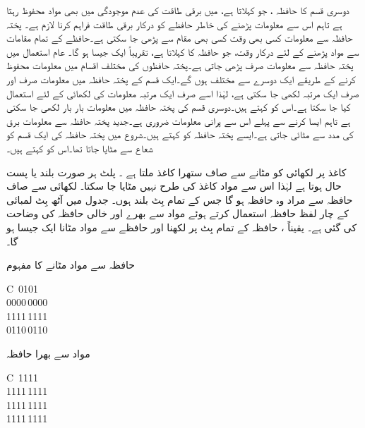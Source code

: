 دوسری قسم کا حافظہ ، جو  کہلاتا ہے،  میں برقی طاقت کی عدم موجودگی میں بھی   مواد محفوظ رہتا ہے تاہم اس سے  معلومات پڑھنے کی خاطر حافظے  کو درکار برقی طاقت فراہم کرنا لازم   ہے۔ پختہ حافظہ سے معلومات کسی بھی وقت کسی بھی  مقام سے پڑھی جا سکتی ہے۔حافظے کے تمام مقامات سے مواد پڑھنے کے لئے درکار وقت، جو حافظہ کا کہلاتا ہے،  تقریباً ایک جیسا ہو گا۔ عام استعمال میں پختہ حافظہ سے معلومات صرف پڑھی جاتی ہے۔پختہ حافظوں  کی مختلف اقسام میں معلومات محفوظ کرنے کے طریقے ایک دوسرے سے  مختلف ہوں گے۔ایک قسم  کے پختہ حافظہ میں معلومات صرف اور صرف ایک مرتبہ لکھی جا سکتی ہے، لہٰذا اسے صرف ایک مرتبہ معلومات کی لکھائی کے لئے استعمال کیا جا سکتا ہے۔اس کو   کہتے ہیں۔دوسری قسم کی پختہ حافظہ میں معلومات  بار بار لکھی  جا سکتی ہے تاہم ایسا کرنے سے پہلے اس  سے پرانی معلومات ضروری ہے۔جدید پختہ حافظہ سے معلومات  برق  کی مدد سے مٹائی  جاتی ہے۔ایسے پختہ حافظہ کو  کہتے ہیں۔شروع میں پختہ حافظہ کی ایک قسم کو شعاع  سے مٹایا جاتا تھا۔اس کو  کہتے ہیں۔

کاغذ پر لکھائی  کو مٹانے سے صاف ستھرا کاغذ ملتا ہے ۔   پلٹ ہر صورت بلند یا پست حال ہوتا ہے لہٰذا اس سے مواد  کاغذ کی طرح  نہیں مٹایا جا سکتا۔  لکھائی سے صاف حافظہ سے مراد وہ حافظہ ہو گا جس کے تمام بِٹ بلند  ہوں۔  جدول  میں  آٹھ بِٹ لمبائی کے چار  لفظ  حافظہ  استعمال کرتے  ہوئے مواد سے بھرے اور خالی حافظہ  کی وضاحت کی گئی ہے۔ یقیناً ، حافظہ کے تمام بِٹ پر  لکھنا اور حافظے سے مواد مٹانا   ایک جیسا ہو گا۔
\begin{table}
\caption{حافظہ سے مواد مٹانے کا  مفہوم}
\label{جدول_حافظہ_خالی}
\centering
\begin{subtable}[t]{0.48\textwidth}
\centering
\begin{tabular}{C}
\,0101\\
0000\,0000\\
1111\,1111\\
0110\,0110\\
\bottomrule
\end{tabular}
\caption{مواد سے بھرا حافظہ}
\end{subtable}%
\begin{subtable}[t]{0.48\textwidth}
\centering
\begin{tabular}{C}
\,1111\\
1111\,1111\\
1111\,1111\\
1111\,1111\\
\bottomrule
\end{tabular}
\caption{مواد سے خالی حافظہ}
\end{subtable}
\end{table}


